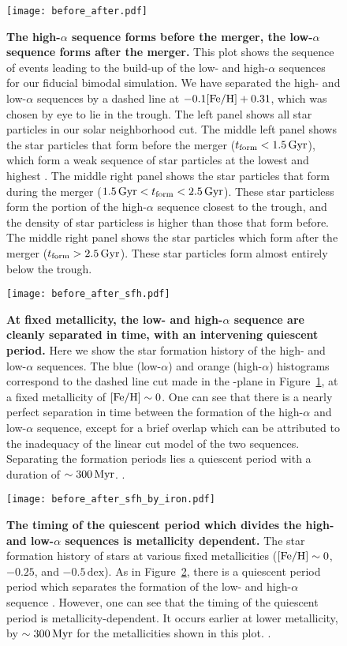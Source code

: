 \begin{figure*}
  \centering
  \texttt{[image: before\_after.pdf]}
  \caption{\textbf{The high-$\alpha$ sequence forms before the merger, the low-$\alpha$ sequence forms after the merger.} This plot shows the sequence of events leading to the build-up of the low- and high-$\alpha$ sequences for our fiducial bimodal simulation. We have separated the high- and low-$\alpha$ sequences by a dashed line at $-0.1[\textrm{Fe}/\textrm{H}] + 0.31$, which was chosen by eye to lie in the trough. The left panel shows all star particles in our solar neighborhood cut. The middle left panel shows the star particles that form before the merger ($t_{\textrm{form}} < 1.5\,\textrm{Gyr}$), which form a weak sequence of star particles at the lowest \FeH and highest \MgFe. The middle right panel shows the star particles that form during the merger ($1.5\,\textrm{Gyr} < t_{\textrm{form}} < 2.5\,\textrm{Gyr}$). These star particless form the portion of the high-$\alpha$ sequence closest to the trough, and the density of star particless is higher than those that form before. The middle right panel shows the star particles which form after the merger ($t_{\textrm{form}} > 2.5\,\textrm{Gyr}$). These star particles form almost entirely below the trough.}
  \label{fig:before_after}
\end{figure*}

\begin{figure}
  \centering
  \texttt{[image: before\_after\_sfh.pdf]}
  \caption{\textbf{At fixed metallicity, the low- and high-$\alpha$ sequence are cleanly separated in time, with an intervening quiescent period.} Here we show the star formation history of the high- and low-$\alpha$ sequences. The blue (low-$\alpha$) and orange (high-$\alpha$) histograms correspond to the dashed line cut made in the \MgFe-\FeH plane in Figure~\ref{fig:before_after}, at a fixed metallicity of $[\textrm{Fe}/\textrm{H}]\sim0$. One can see that there is a nearly perfect separation in time between the formation of the high-$\alpha$ and low-$\alpha$ sequence, except for a brief overlap which can be attributed to the inadequacy of the linear cut model of the two sequences. Separating the formation periods lies a quiescent period with a duration of $\sim300\,\textrm{Myr}$. .}
  \label{fig:before_after_sfh}
\end{figure}

\begin{figure}
  \centering
  \texttt{[image: before\_after\_sfh\_by\_iron.pdf]}
  \caption{\textbf{The timing of the quiescent period which divides the high- and low-$\alpha$ sequences is metallicity dependent.} The star formation history of stars at various fixed metallicities ($[\textrm{Fe}/\textrm{H}]\sim0$, $-0.25$, and $-0.5\,\textrm{dex}$). As in Figure~\ref{fig:before_after_sfh}, there is a quiescent period period which separates the formation of the low- and high-$\alpha$ sequence . However, one can see that the timing of the quiescent period is metallicity-dependent. It occurs earlier at lower metallicity, by $\sim300\,\textrm{Myr}$ for the metallicities shown in this plot. .}
  \label{fig:before_after_sfh_by_iron}
\end{figure}

